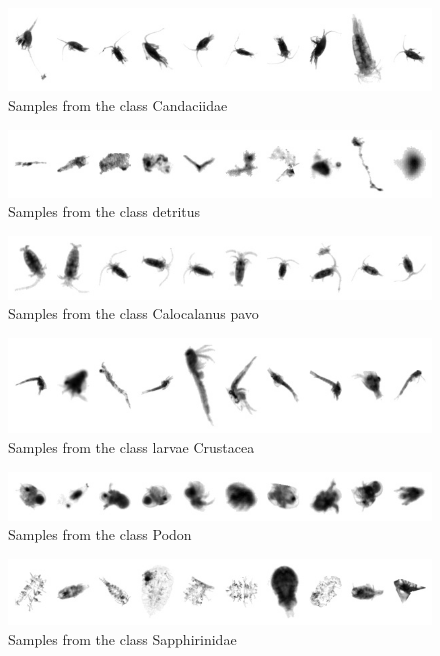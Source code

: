 \begin{figure}[h]
\includegraphics[width=\columnwidth]{collage/000_Candaciidae.jpg}\caption{Samples from the class Candaciidae }
\end{figure}
\begin{figure}[h]
\includegraphics[width=\columnwidth]{collage/001_detritus.jpg}\caption{Samples from the class detritus }
\end{figure}
\begin{figure}[h]
\includegraphics[width=\columnwidth]{collage/002_Calocalanus_pavo.jpg}\caption{Samples from the class Calocalanus pavo }
\end{figure}
\begin{figure}[h]
\includegraphics[width=\columnwidth]{collage/003_larvae__Crustacea.jpg}\caption{Samples from the class larvae  Crustacea }
\end{figure}
\begin{figure}[h]
\includegraphics[width=\columnwidth]{collage/004_Podon.jpg}\caption{Samples from the class Podon }
\end{figure}
\begin{figure}[h]
\includegraphics[width=\columnwidth]{collage/005_Sapphirinidae.jpg}\caption{Samples from the class Sapphirinidae }
\end{figure}
